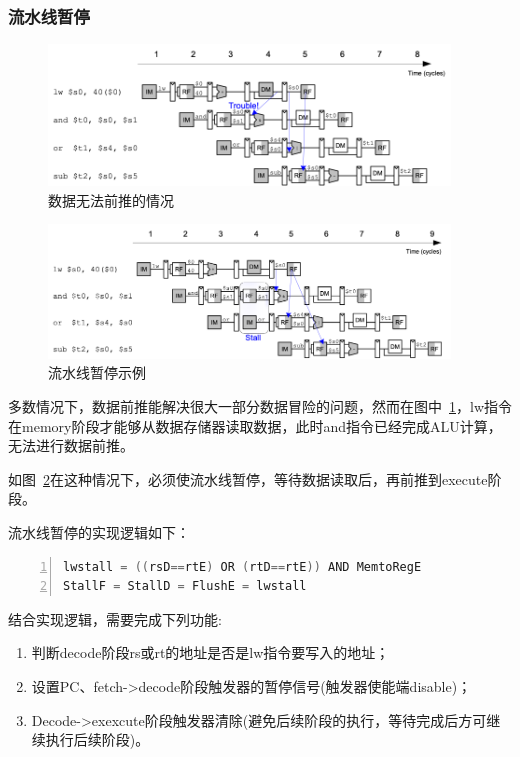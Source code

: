 \subsubsection{流水线暂停}
\begin{figure}[htbp]
    \centering
    \includegraphics[width = 0.95\textwidth]{image/data_forward_failed.png}
    \caption{数据无法前推的情况}
    \label{fig:section_2_6}
\end{figure}

\begin{figure}[htbp]
    \centering
    \includegraphics[width = 0.95\textwidth]{image/pipe_pause.png}
    \caption{流水线暂停示例}
    \label{fig:section_2_7}
\end{figure}

多数情况下，数据前推能解决很大一部分数据冒险的问题，然而在图中~\ref{fig:section_2_6}，lw指令在memory阶段才能够从数据存储器读取数据，此时and指令已经完成ALU计算，无法进行数据前推。
	
如图~\ref{fig:section_2_7}在这种情况下，必须使流水线暂停，等待数据读取后，再前推到execute阶段。

流水线暂停的实现逻辑如下：
\begin{lstlisting}[language=Verilog,caption=流水线暂停的实现逻辑,numbers=left,xleftmargin=5em,xrightmargin=5em, aboveskip=2em]
lwstall = ((rsD==rtE) OR (rtD==rtE)) AND MemtoRegE
StallF = StallD = FlushE = lwstall
\end{lstlisting}

结合实现逻辑，需要完成下列功能:
\begin{enumerate}
    \item 判断decode阶段rs或rt的地址是否是lw指令要写入的地址；
    \item 设置PC、fetch->decode阶段触发器的暂停信号(触发器使能端disable)；
    \item Decode->exexcute阶段触发器清除(避免后续阶段的执行，等待完成后方可继续执行后续阶段)。
\end{enumerate}

